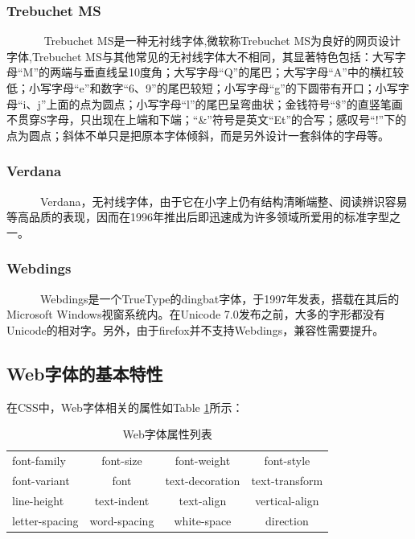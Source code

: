 \documentclass[a4paper]{article}
\begin{document}
	\subsubsection{Trebuchet MS} 
	
~~~~~~	 Trebuchet MS是一种无衬线字体,微软称Trebuchet MS为良好的网页设计字体,Trebuchet MS与其他常见的无衬线字体大不相同，其显著特色包括：大写字母“M”的两端与垂直线呈10度角；大写字母“Q”的尾巴；大写字母“A”中的横杠较低；小写字母“e”和数字“6、9”的尾巴较短；小写字母“g”的下圆带有开口；小写字母“i、j”上面的点为圆点；小写字母“l”的尾巴呈弯曲状；金钱符号“\$”的直竖笔画不贯穿S字母，只出现在上端和下端；“\&”符号是英文“Et”的合写；感叹号“!”下的点为圆点；斜体不单只是把原本字体倾斜，而是另外设计一套斜体的字母等。
   
	\subsubsection{Verdana} 
	
~~~~~~Verdana，无衬线字体，由于它在小字上仍有结构清晰端整、阅读辨识容易等高品质的表现，因而在1996年推出后即迅速成为许多领域所爱用的标准字型之一。
	\subsubsection{Webdings} 
	
~~~~~~Webdings是一个TrueType的dingbat字体，于1997年发表，搭载在其后的Microsoft Windows视窗系统内。在Unicode 7.0发布之前，大多的字形都没有Unicode的相对字。另外，由于firefox并不支持Webdings，兼容性需要提升。
    

\subsection{Web字体的基本特性}

在CSS中，Web字体相关的属性如Table \ref{tb1}所示：

\begin{table}[h]
\centering
\begin{tabular}{lccc}  %
\hline
font-family	 &font-size &font-weight &font-style\\         %
font-variant &font &text-decoration &text-transform\\        %
line-height &text-indent &text-align &vertical-align\\ 
letter-spacing & word-spacing & white-space & direction\\ \hline
\end{tabular}
\caption{Web字体属性列表}
\label{tb1}
\end{table}
\end{document}
